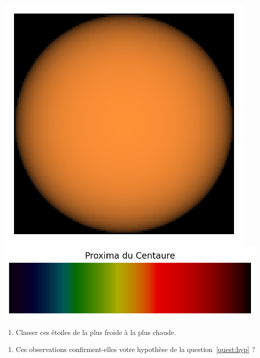 \documentclass[12pt,a4paper,fleqn]{article}
\begin{document}
\begin{center}
\includegraphics[height=\localheight]{images/star_proxima_centauri.png}
\includegraphics[height=\localheight]{images/spectrum_star_proxima_centauri.png}
\end{center}

\begin{enumerate}[resume]
\item \anarai{}

Classer ces étoiles de la plus froide à la plus chaude. \thumbsup{}

\end{enumerate}

\begin{center}
\end{center}

\begin{enumerate}[resume]
\item \val{}

Ces observations confirment-elles votre hypothèse de la question~\ref{quest:hyp} ?
\end{enumerate}

\begin{center}
\end{center}
\vfill

\begin{appel}
\val{}
\end{appel}
\end{document}
